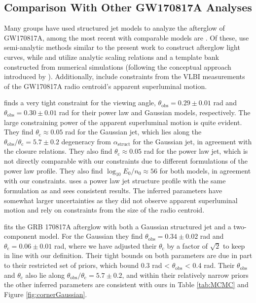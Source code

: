 \documentclass[twocolumn]{aastex62}
\newcommand{\gwbns}{GW170817A}
\newcommand{\grbbns}{GRB 170817A}
\newcommand{\thobs}{\ensuremath{\theta_{\mathrm{obs}}}}
\newcommand{\thC}{\ensuremath{\theta_{\mathrm{c}}}}
\begin{document}
\subsection{Comparison With Other \gwbns{} Analyses}

Many groups have used structured jet models to analyze the afterglow of \gwbns{}, among the most recent with comparable models are \citet{Hotokezaka:2018aa, Ghirlanda:2019aa, Lamb:2019aa, Wu:2018aa, Hajela:2019aa}.  Of these, \citet{Hotokezaka:2018aa, Ghirlanda:2019aa, Lamb:2019aa} use semi-analytic methods similar to the present work to construct afterglow light curves, while \citet{Wu:2018aa} and \citet{Hajela:2019aa} utilize analytic scaling relations and a template bank constructed from numerical simulations (following the conceptual approach introduced by \citet{van-Eerten:2012ac}).  Additionally, \citet{Hotokezaka:2018aa, Ghirlanda:2019aa} include constraints from the VLBI measurements of the \gwbns{} radio centroid's apparent superluminal motion.

\citet{Hotokezaka:2018aa} finds a very tight constraint for the viewing angle, $\thobs = 0.29 \pm 0.01$ rad and $\thobs = 0.30 \pm 0.01$ rad for their power law and Gaussian models, respectively.  The large constraining power of the apparent superluminal motion is quite evident.  They find $\thC \approx 0.05$ rad for the Gaussian jet, which lies along the $\thobs/\thC = 5.7\pm 0.2$ degeneracy from $\alpha_{\mathrm{struct}}$ for the Gaussian jet, in agreement with the closure relations.  They also find $\thC \approx 0.05$ rad for the power law jet, which is not directly comparable with our constraints due to different formulations of the power law profile.  They also find $\log_{10} E_0 / n_0 \approx 56$ for both models, in agreement with our constraints.  \citet{Ghirlanda:2019aa} uses a power law jet structure profile with the same formulation as \citet{Hotokezaka:2018aa} and sees consistent results.  The inferred parameters have somewhat larger uncertainties as they did not observe apparent superluminal motion and rely on constraints from the size of the radio centroid.

\citet{Lamb:2019aa} fits the \grbbns{} afterglow with both a Gaussian structured jet and a two-component model.  For the Gaussian they find $\thobs = 0.34 \pm 0.02$ rad and $\thC = 0.06 \pm 0.01$ rad, where we have adjusted their $\thC$ by a factor of $\sqrt{2}$ to keep in line with our definition.  Their tight bounds on both parameters are due in part to their restricted set of priors, which bound 0.3 rad < $\thobs$ < 0.4 rad.  Their $\thobs$ and $\thC$ also lie along $\thobs/\thC = 5.7 \pm 0.2$, and within their relatively narrow priors the other inferred parameters are consistent with ours in Table \ref{tab:MCMC} and Figure \ref{fig:cornerGaussian}.
\end{document}
